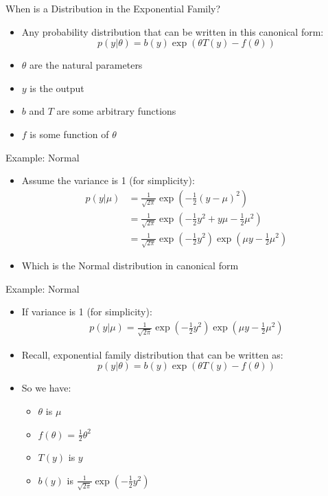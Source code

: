 \documentclass[aspectratio=169]{beamer}
\begin{document}
\begin{frame}{When is a Distribution in the Exponential Family?}

\begin{itemize}
\item Any probability distribution that can be written in this canonical form:
$$p (y | \theta) = b (y) \exp (\theta T(y) - f (\theta))$$
\item  $\theta$ are the natural parameters
\item  $y$ is the output
\item  $b$ and $T$ are some arbitrary functions
\item  $f$ is some function of $\theta$
\end{itemize}
\end{frame}
\begin{frame}{Example: Normal}

\begin{itemize}
\item Assume the variance is 1 (for simplicity): %
\begin{align}
p (y | \mu) &= \frac{1}{\sqrt{2 \pi}} \exp (-\frac{1}{2} (y -\mu)^2) \nonumber \\
	&= \frac{1}{\sqrt{2 \pi}} \exp (- \frac{1}{2}y^2 + y \mu - \frac{1}{2}\mu^2) \nonumber \\
	&= \frac{1}{\sqrt{2 \pi}} \exp (-\frac{1}{2}y^2) \exp (\mu y - \frac{1}{2}\mu^2) \nonumber
\end{align}
\item Which is the Normal distribution in canonical form
\end{itemize}
\end{frame}
\begin{frame}{Example: Normal}

\begin{itemize}
\item If variance is 1 (for simplicity):
\begin{align}
p (y | \mu) = \frac{1}{\sqrt{2 \pi}} \exp (-\frac{1}{2}y^2) \exp (\mu y - \frac{1}{2}\mu^2) \nonumber
\end{align}
\item Recall, exponential family distribution that can be written as:
$$p (y | \theta) = b (y) \exp (\theta T(y) - f (\theta))$$
\item So we have:
        \begin{itemize}
	\item $\theta$ is $\mu$
	\item $f(\theta)$ = $\frac{1}{2}\theta^2$
	\item $T (y)$ is $y$
	\item $b (y)$ is $\frac{1}{\sqrt{2 \pi}} \exp (-\frac{1}{2}y^2)$
	\end{itemize}
\end{itemize}
\end{frame}
\end{document}
